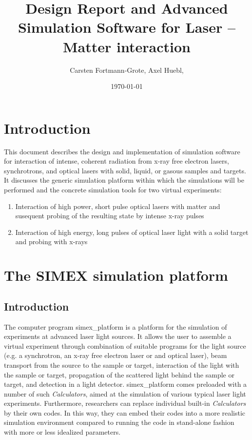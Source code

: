 \documentclass[a4paper]{article}
\title{Design Report and Advanced Simulation Software for Laser -- Matter interaction}
\author{Carsten Fortmann-Grote, Axel Huebl, } %
\date{\today}
\begin{document}
\maketitle
\section{Introduction}
This document describes the design and implementation of simulation software for interaction of intense, coherent radiation from x-ray free
electron lasers, synchrotrons, and optical lasers with solid, liquid, or gasous samples and targets.
It discusses the generic simulation platform within which the simulations will be performed and the
concrete simulation tools for two virtual experiments:
\begin{enumerate}
  \item Interaction of high power, short pulse optical lasers with matter and susequent probing of the resulting state by intense x-ray pulses
  \item Interaction of high energy, long pulses of optical laser light with a solid target and probing with x-rays
\end{enumerate}%

\section{The SIMEX simulation platform \label{sec:simex_platform}}
%
\subsection{Introduction}
The computer program \textsf{simex\_platform} is a platform for the simulation of experiments at advanced laser light sources. It allows the
user to assemble a virtual experiment through combination of suitable programs for the light source (e.g. a synchrotron, an x-ray free electron
laser or and optical laser), beam transport from the source to the sample or target, interaction of the light with the sample or target,
propagation of the scattered light behind the sample or target, and detection in a light detector. \textsf{simex\_platform} comes preloaded with
a number of such \textit{Calculators}, aimed at the simulation of various typical laser light experiments. Furthermore, researchers
can replace individual built-in \textit{Calculators} by their own codes. In this way, they can embed their codes
into a more realistic simulation environment compared to running the code in stand-alone fashion with more or less idealized parameters.
%
\end{document}
